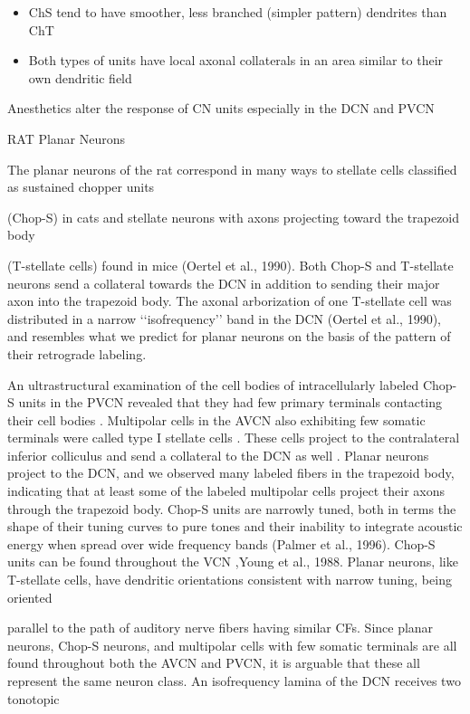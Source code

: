 \documentclass[10pt,a4paper]{article}
\begin{document}
\begin{itemize}
\item ChS tend to have smoother, less branched (simpler pattern) dendrites than
  ChT
\item Both types of units have local axonal collaterals in an area similar to
  their own dendritic field
\end{itemize}
Anesthetics alter the response of CN units especially in the DCN and PVCN

\citep{DoucetRyugo:1997} RAT Planar Neurons

The planar neurons of the rat correspond in many ways to stellate cells
classified as sustained chopper units

(Chop-S) in cats \citep{SmithRhode:1989} and stellate neurons with axons
projecting toward the trapezoid body

(T-stellate cells) found in mice (Oertel et al., 1990). Both Chop-S and
T-stellate neurons send a collateral towards the DCN in addition to sending
their major axon into the trapezoid body. The axonal arborization of one
T-stellate cell was distributed in a narrow
{\textquoteleft}{\textquoteleft}isofrequency{\textquoteright}{\textquoteright}
band in the DCN (Oertel et al., 1990), and resembles what we predict for planar
neurons on the basis of the pattern of their retrograde labeling.

An ultrastructural examination of the cell bodies of intracellularly labeled
Chop-S units in the PVCN revealed that they had few primary terminals contacting their cell bodies
\citep{SmithRhode:1989}. Multipolar cells in the AVCN also exhibiting few
somatic terminals were called type I stellate cells \citep{Cant:1981}. These
cells project to the contralateral inferior colliculus \citep{Cant:1982} and
send a collateral to the DCN as well \citep{Adams:1983}. Planar neurons project
to the DCN, and we observed many labeled fibers in the trapezoid body,
indicating that at least some of the labeled multipolar cells project their
axons through the trapezoid body. Chop-S units are narrowly tuned, both in terms
the shape of their tuning curves to pure tones \citep{RhodeSmith:1986} and their
inability to integrate acoustic energy when spread over wide frequency bands
(Palmer et al., 1996).  Chop-S units can be found throughout the VCN
\citep{Pfeiffer:1966,Bourk, 1976},Young et al., 1988. Planar neurons, like
T-stellate cells, have dendritic orientations consistent with narrow tuning,
being oriented

parallel to the path of auditory nerve fibers having similar CFs. Since planar
neurons, Chop-S neurons, and multipolar cells with few somatic terminals are all
found throughout both the AVCN and PVCN, it is arguable that these all represent
the same neuron class. An isofrequency lamina of the DCN receives two tonotopic
\end{document}
